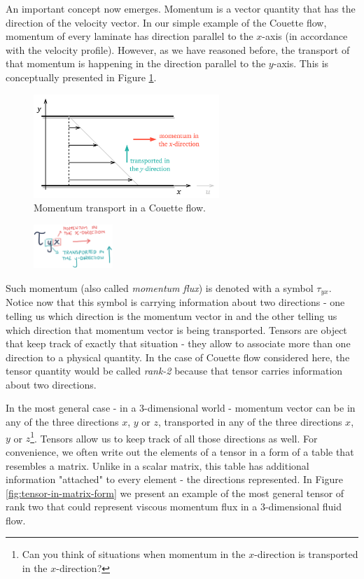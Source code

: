 \documentclass[10pt,twocolumn]{article}
\begin{document}
An important concept now emerges. Momentum is a vector quantity that has the direction of the velocity vector. In our simple example of the Couette flow, momentum of every laminate has direction parallel to the $x$-axis (in accordance with the velocity profile). However, as we have reasoned before, the transport of that momentum is happening in the direction parallel to the $y$-axis. This is conceptually presented in Figure \ref{fig:couette-flow-momentum-transport}. 
\begin{figure}[H]
\centering\includegraphics[width=7cm]{couette-flow-momentum-transport.png}
\caption{Momentum transport in a Couette flow.}
\label{fig:couette-flow-momentum-transport}
\end{figure}
\begin{figure}
\centering\includegraphics[width=3cm]{tau_y_x.png}
\label{fig:tau_y_x}
\end{figure}
Such momentum (also called \textit{momentum flux}) is denoted with a symbol $\tau_{yx}$. Notice now that this symbol is carrying information about two directions - one telling us which direction is the momentum vector in and the other telling us which direction that momentum vector is being transported. Tensors are object that keep track of exactly that situation - they allow to associate more than one direction to a physical quantity. In the case of Couette flow considered here, the tensor quantity would be called \textit{rank-2} because that tensor carries information about two directions.

In the most general case - in a 3-dimensional world - momentum vector can be in any of the three directions $x$, $y$ or $z$, transported in any of the three directions $x$, $y$ or $z$\footnote{Can you think of situations when momentum in the $x$-direction is transported in the $x$-direction?}. Tensors allow us to keep track of all those directions as well. For convenience, we often write out the elements of a tensor in a form of a table that resembles a matrix. Unlike in a scalar matrix, this table has additional information "attached" to every element - the directions represented. In Figure \ref{fig:tensor-in-matrix-form} we present an example of the most general tensor of rank two that could represent viscous momentum flux in a 3-dimensional fluid flow.
\end{document}
